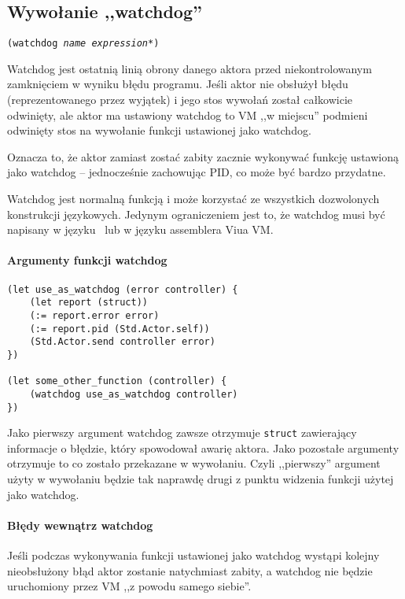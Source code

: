 \subsection{Wywołanie ,,watchdog''}
\label{viuact_spec_watchdog_call}

\texttt{(watchdog \emph{name} \emph{expression}*)}
\newline

Watchdog jest ostatnią linią obrony danego aktora przed niekontrolowanym zamknięciem w wyniku błędu programu.
Jeśli aktor nie obsłużył błędu (reprezentowanego przez wyjątek) i jego stos wywołań został całkowicie
odwinięty, ale aktor ma ustawiony watchdog to VM ,,w miejscu'' podmieni odwinięty stos na wywołanie funkcji
ustawionej jako watchdog.

Oznacza to, że aktor zamiast zostać zabity zacznie wykonywać funkcję ustawioną jako watchdog -- jednocześnie
zachowując PID, co może być bardzo przydatne.

Watchdog jest normalną funkcją i może korzystać ze wszystkich dozwolonych konstrukcji językowych.
Jedynym ograniczeniem jest to, że watchdog musi być napisany w języku \ViuAct\ lub w języku assemblera Viua VM.

\paragraph*{Argumenty funkcji watchdog}

\begin{lstlisting}
(let use_as_watchdog (error controller) {
    (let report (struct))
    (:= report.error error)
    (:= report.pid (Std.Actor.self))
    (Std.Actor.send controller error)
})

(let some_other_function (controller) {
    (watchdog use_as_watchdog controller)
})
\end{lstlisting}

Jako pierwszy argument watchdog zawsze otrzymuje \texttt{struct} zawierający informacje o błędzie, który
spowodował awarię aktora. Jako pozostałe argumenty otrzymuje to co zostało przekazane w wywołaniu.
Czyli ,,pierwszy'' argument użyty w wywołaniu będzie tak naprawdę drugi z punktu widzenia funkcji użytej jako
watchdog.

\paragraph*{Błędy wewnątrz watchdog}

Jeśli podczas wykonywania funkcji ustawionej jako watchdog wystąpi kolejny nieobsłużony błąd aktor zostanie
natychmiast zabity, a watchdog nie będzie uruchomiony przez VM ,,z powodu samego siebie''.

